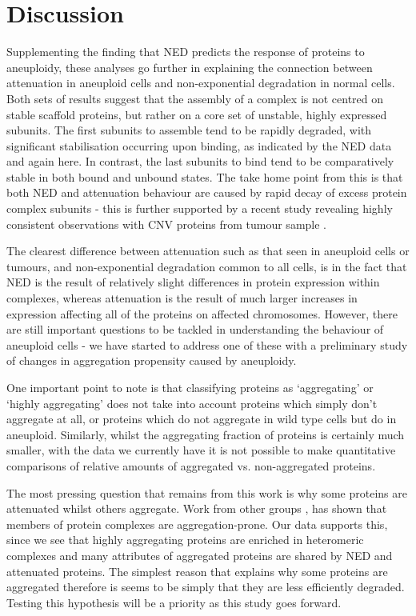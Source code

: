 \documentclass[a4paper,11pt,twoside,openright]{scrbook}
\begin{document}
\section{Discussion}
Supplementing the finding that NED predicts the response of proteins to aneuploidy, these analyses go further in explaining the connection between attenuation in aneuploid cells and non-exponential degradation in normal cells. Both sets of results suggest that the assembly of a complex is not centred on stable scaffold proteins, but rather on a core set of unstable, highly expressed subunits. The first subunits to assemble tend to be rapidly degraded, with significant stabilisation occurring upon binding, as indicated by the NED data and again here. In contrast, the last subunits to bind tend to be comparatively stable in both bound and unbound states. The take home point from this is that both NED and attenuation behaviour are caused by rapid decay of excess protein complex subunits - this is further supported by a recent study revealing highly consistent observations with CNV proteins from tumour sample \cite{Goncalves2017}.

The clearest difference between attenuation such as that seen in aneuploid cells or tumours, and non-exponential degradation common to all cells, is in the fact that NED is the result of relatively slight differences in protein expression within complexes, whereas attenuation is the result of much larger increases in expression affecting all of the proteins on affected chromosomes. However, there are still important questions to be tackled in understanding the behaviour of aneuploid cells - we have started to address one of these with a preliminary study of changes in aggregation propensity caused by aneuploidy.

One important point to note is that classifying proteins as `aggregating' or `highly aggregating' does not take into account proteins which simply don't aggregate at all, or proteins which do not aggregate in wild type cells but do in aneuploid. Similarly, whilst the aggregating fraction of proteins is certainly much smaller, with the data we currently have it is not possible to make quantitative comparisons of relative amounts of aggregated vs. non-aggregated proteins.

The most pressing question that remains from this work is why some proteins are attenuated whilst others aggregate. Work from other groups \cite{Pechmann2009, Yang2012}, has shown that members of protein complexes are aggregation-prone. Our data supports this, since we see that highly aggregating proteins are enriched in heteromeric complexes and many attributes of aggregated proteins are shared by NED and attenuated proteins. The simplest reason that explains why some proteins are aggregated therefore is seems to be simply that they are less efficiently degraded. Testing this hypothesis will be a priority as this study goes forward.
\end{document}
